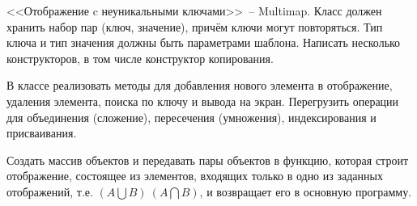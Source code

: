 
<<Отображение c неуникальными ключами>>~-- Multimap. Класс должен хранить набор
пар (ключ, значение), причём ключи могут повторяться. Тип ключа и тип значения должны
быть параметрами шаблона. Написать несколько конструкторов, в том числе конструктор
копирования.

В классе реализовать методы для добавления нового элемента в
отображение, удаления элемента, поиска по ключу и вывода на экран. Перегрузить
операции для объединения (сложение), пересечения (умножения), индексирования и
присваивания.

Создать массив объектов и передавать пары объектов в функцию, которая
строит отображение, состоящее из элементов, входящих только в одно из заданных
отображений, т.е. $(A\bigcup B) \ (A\bigcap B)$, и возвращает его в основную программу.
